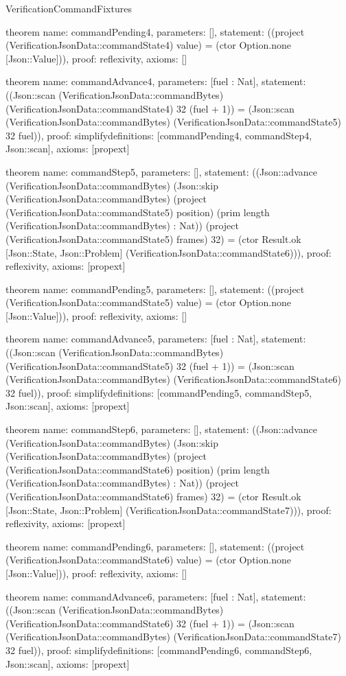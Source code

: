 \begin{lexlean}{VerificationCommandFixtures}
\begin{semanticmodule}
theorem{
  name: commandPending4,
  parameters: [],
  statement: ((project (VerificationJsonData::commandState4) value) = (ctor Option.none [Json::Value])),
  proof: reflexivity{},
  axioms: []
}

theorem{
  name: commandAdvance4,
  parameters: [fuel : Nat],
  statement: ((Json::scan (VerificationJsonData::commandBytes) (VerificationJsonData::commandState4) 32 (fuel + 1)) = (Json::scan (VerificationJsonData::commandBytes) (VerificationJsonData::commandState5) 32 fuel)),
  proof: simplify{definitions: [commandPending4, commandStep4, Json::scan]},
  axioms: [propext]
}

theorem{
  name: commandStep5,
  parameters: [],
  statement: ((Json::advance (VerificationJsonData::commandBytes) (Json::skip (VerificationJsonData::commandBytes) (project (VerificationJsonData::commandState5) position) (prim length (VerificationJsonData::commandBytes) : Nat)) (project (VerificationJsonData::commandState5) frames) 32) = (ctor Result.ok [Json::State, Json::Problem] (VerificationJsonData::commandState6))),
  proof: reflexivity{},
  axioms: [propext]
}

theorem{
  name: commandPending5,
  parameters: [],
  statement: ((project (VerificationJsonData::commandState5) value) = (ctor Option.none [Json::Value])),
  proof: reflexivity{},
  axioms: []
}

theorem{
  name: commandAdvance5,
  parameters: [fuel : Nat],
  statement: ((Json::scan (VerificationJsonData::commandBytes) (VerificationJsonData::commandState5) 32 (fuel + 1)) = (Json::scan (VerificationJsonData::commandBytes) (VerificationJsonData::commandState6) 32 fuel)),
  proof: simplify{definitions: [commandPending5, commandStep5, Json::scan]},
  axioms: [propext]
}

theorem{
  name: commandStep6,
  parameters: [],
  statement: ((Json::advance (VerificationJsonData::commandBytes) (Json::skip (VerificationJsonData::commandBytes) (project (VerificationJsonData::commandState6) position) (prim length (VerificationJsonData::commandBytes) : Nat)) (project (VerificationJsonData::commandState6) frames) 32) = (ctor Result.ok [Json::State, Json::Problem] (VerificationJsonData::commandState7))),
  proof: reflexivity{},
  axioms: [propext]
}

theorem{
  name: commandPending6,
  parameters: [],
  statement: ((project (VerificationJsonData::commandState6) value) = (ctor Option.none [Json::Value])),
  proof: reflexivity{},
  axioms: []
}

theorem{
  name: commandAdvance6,
  parameters: [fuel : Nat],
  statement: ((Json::scan (VerificationJsonData::commandBytes) (VerificationJsonData::commandState6) 32 (fuel + 1)) = (Json::scan (VerificationJsonData::commandBytes) (VerificationJsonData::commandState7) 32 fuel)),
  proof: simplify{definitions: [commandPending6, commandStep6, Json::scan]},
  axioms: [propext]
}


\end{semanticmodule}
\end{lexlean}

